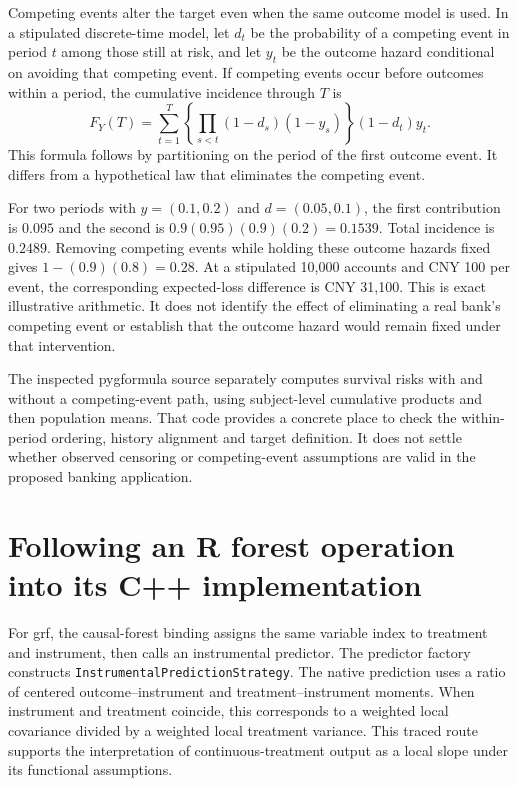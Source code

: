 Competing events alter the target even when the same outcome model is used.
In a stipulated discrete-time model, let $d_t$ be the probability of a competing
event in period $t$ among those still at risk, and let $y_t$ be the outcome
hazard conditional on avoiding that competing event. If competing events occur
before outcomes within a period, the cumulative incidence through $T$ is
\[
 F_Y(T)=\sum_{t=1}^T
 \left\{\prod_{s<t}(1-d_s)(1-y_s)\right\}(1-d_t)y_t.
\]
This formula follows by partitioning on the period of the first outcome event.
It differs from a hypothetical law that eliminates the competing event.

For two periods with $y=(0.1,0.2)$ and $d=(0.05,0.1)$, the first contribution
is $0.095$ and the second is $0.9(0.95)(0.9)(0.2)=0.1539$. Total incidence is
$0.2489$. Removing competing events while holding these outcome hazards fixed
gives $1-(0.9)(0.8)=0.28$. At a stipulated 10,000 accounts and CNY 100 per event,
the corresponding expected-loss difference is CNY 31,100. This is exact
illustrative arithmetic. It does not identify the effect of eliminating a
real bank's competing event or establish that the outcome hazard would remain
fixed under that intervention.\cite{v131_project_semantics}

The inspected pygformula source separately computes survival risks with and
without a competing-event path, using subject-level cumulative products and
then population means. That code provides a concrete place to check the
within-period ordering, history alignment and target definition. It does not
settle whether observed censoring or competing-event assumptions are valid in
the proposed banking application.\cite{v131_sw_pygformula}

\section{Following an R forest operation into its C++ implementation}

For grf, the causal-forest binding assigns the same variable index to treatment
and instrument, then calls an instrumental predictor. The predictor factory
constructs \texttt{InstrumentalPredictionStrategy}. The native prediction uses
a ratio of centered outcome--instrument and treatment--instrument moments.
When instrument and treatment coincide, this corresponds to a weighted local
covariance divided by a weighted local treatment variance. This traced route
supports the interpretation of continuous-treatment output as a local slope
under its functional assumptions.\cite{v131_sw_grf}

